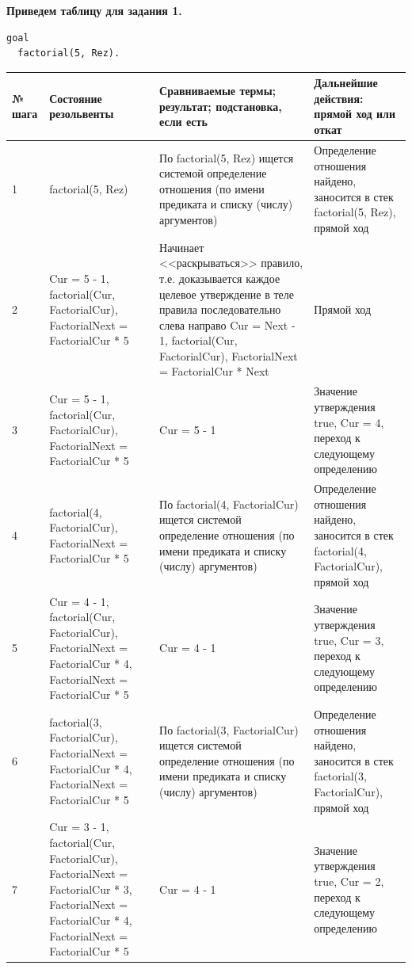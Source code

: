 \documentclass[a4paper,14pt]{extreport} %
\begin{document}
\textbf{Приведем таблицу для задания 1. }
\begin{lstlisting}
goal
  factorial(5, Rez).
\end{lstlisting}

\begin{longtable}{|p{0.5cm}|p{5cm}|p{6cm}|p{5.5cm}|}
	\hline
 	№ шага & Состояние резольвенты & Сравниваемые термы; результат; подстановка, если есть  & Дальнейшие действия: прямой ход или откат \\ \hline
	1 & factorial(5, Rez) & По factorial(5, Rez) ищется системой определение отношения (по имени предиката и списку (числу) аргументов) & Определение отношения найдено, заносится в стек factorial(5, Rez), прямой ход \\ \hline
	2 &Cur = 5 - 1, factorial(Cur, FactorialCur), FactorialNext = FactorialCur * 5 & Начинает <<раскрываться>> правило, т.е. доказывается каждое целевое утверждение в теле правила последовательно слева направо
	Cur = Next - 1, factorial(Cur, FactorialCur), FactorialNext = FactorialCur * Next & Прямой ход\\ \hline
	
	3 & Cur = 5 - 1, factorial(Cur, FactorialCur), FactorialNext = FactorialCur * 5 & Cur = 5 - 1	
	& Значение утверждения true, Cur = 4, переход к следующему определению\\ \hline

	4 & factorial(4, FactorialCur), FactorialNext = FactorialCur * 5 & По factorial(4, FactorialCur) ищется системой определение отношения (по имени предиката и списку (числу) аргументов) & Определение отношения найдено, заносится в стек factorial(4, FactorialCur), прямой ход \\ \hline
	
	5 & Cur = 4 - 1, factorial(Cur, FactorialCur), FactorialNext = FactorialCur * 4, FactorialNext = FactorialCur * 5 & Cur = 4 - 1	
	& Значение утверждения true, Cur = 3, переход к следующему определению\\ \hline
	
	6 & factorial(3, FactorialCur), FactorialNext = FactorialCur * 4, FactorialNext = FactorialCur * 5 & По factorial(3, FactorialCur) ищется системой определение отношения (по имени предиката и списку (числу) аргументов) & Определение отношения найдено, заносится в стек factorial(3, FactorialCur), прямой ход \\ \hline
	
	7 & Cur = 3 - 1, factorial(Cur, FactorialCur), FactorialNext = FactorialCur * 3, FactorialNext = FactorialCur * 4, FactorialNext = FactorialCur * 5 & Cur = 4 - 1	
	& Значение утверждения true, Cur = 2, переход к следующему определению\\ \hline
	

\end{longtable}
\end{document}
